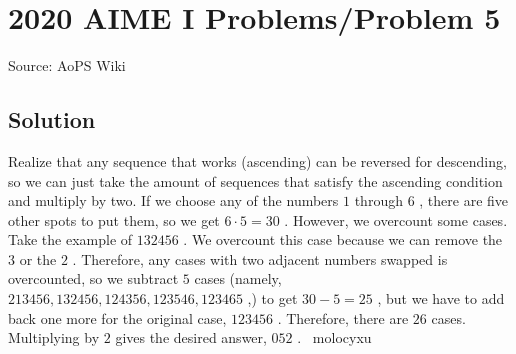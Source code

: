 \documentclass[12pt]{article}
\begin{document}
\section*{{2020 AIME I Problems/Problem 5}}
Source: AoPS Wiki

\subsection*{Solution}
Realize that any sequence that works (ascending) can be reversed for descending, so we can just take the amount of sequences that satisfy the ascending condition and multiply by two. If we choose any of the numbers $1$ through $6$ , there are five other spots to put them, so we get $6 \cdot 5 = 30$ . However, we overcount some cases. Take the example of $132456$ . We overcount this case because we can remove the $3$ or the $2$ . Therefore, any cases with two adjacent numbers swapped is overcounted, so we subtract $5$ cases (namely, $213456, 132456, 124356, 123546, 123465$ ,) to get $30-5=25$ , but we have to add back one more for the original case, $123456$ . Therefore, there are $26$ cases. Multiplying by $2$ gives the desired answer, $\boxed{052}$ . ~molocyxu
\end{document}

